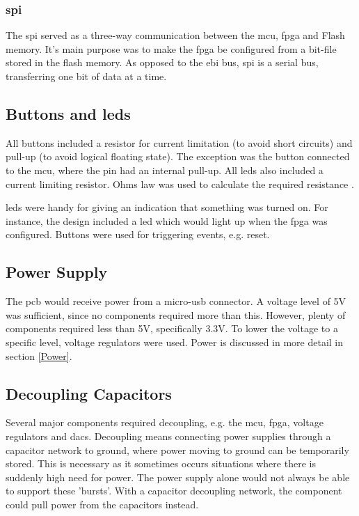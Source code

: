 \subsubsection{\gls{spi}}
The \gls{spi} served as a three-way communication between the \gls{mcu}, \gls{fpga} and Flash memory.
It's main purpose was to make the \gls{fpga} be configured from a bit-file stored in the flash memory.
As opposed to the \gls{ebi} bus, \gls{spi} is a serial bus, transferring one bit of data at a time.

\subsection{Buttons and \gls{led}s}
All buttons included a resistor for current limitation (to avoid short circuits) and pull-up (to avoid logical floating state).
The exception was the button connected to the \gls{mcu}, where the pin had an internal pull-up.
All \gls{led}s also included a current limiting resistor.
Ohms law was used to calculate the required resistance \cite{ohm}.

\gls{led}s were handy for giving an indication that something was turned on.
For instance, the design included a \gls{led} which would light up when the \gls{fpga} was configured.
Buttons were used for triggering events, e.g. reset.

\subsection{Power Supply}
The \gls{pcb} would receive power from a micro-\gls{usb} connector.
A voltage level of 5V was sufficient, since no components required more than this.
However, plenty of components required less than 5V, specifically 3.3V.
To lower the voltage to a specific level, voltage regulators were used.
Power is discussed in more detail in section \ref{Power}.

\subsection{Decoupling Capacitors}
Several major components required decoupling, e.g. the \gls{mcu}, \gls{fpga}, voltage regulators and \gls{dac}s.
Decoupling means connecting power supplies through a capacitor network to ground, where power moving to ground can be temporarily stored.
This is necessary as it sometimes occurs situations where there is suddenly high need for power.
The power supply alone would not always be able to support these 'bursts'.
With a capacitor decoupling network, the component could pull power from the capacitors instead.

